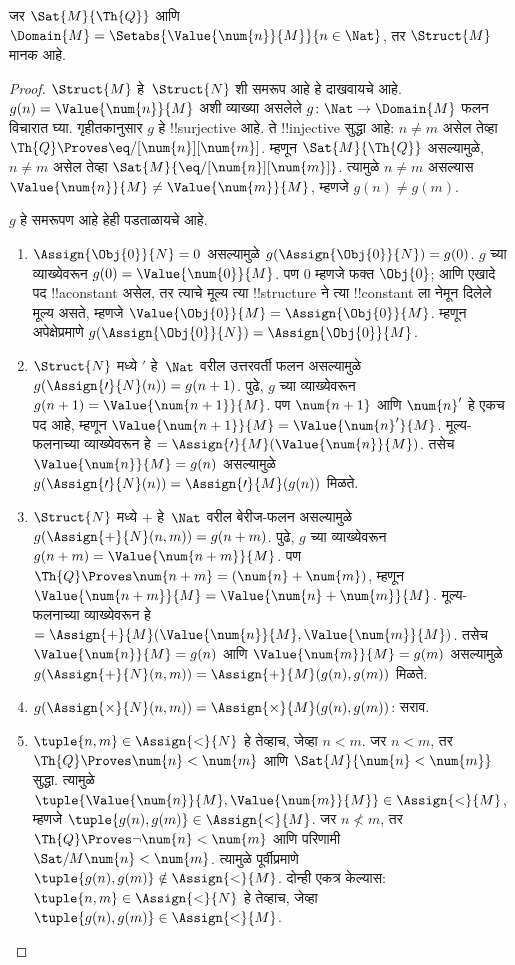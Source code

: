 \documentclass[../../../include/open-logic-section]{subfiles}
\begin{document}
\begin{prop}
जर $\Sat{M}{\Th{Q}}$ आणि $\Domain{M} =
\Setabs{\Value{\num{n}}{M}}{n \in \Nat}$, तर $\Struct{M}$ मानक आहे.
\end{prop}

\begin{proof}
$\Struct{M}$ हे~$\Struct{N}$ शी समरूप आहे हे दाखवायचे आहे.
$g(n) = \Value{\num{n}}{M}$ अशी व्याख्या असलेले
$g\colon \Nat \to \Domain{M}$ फलन विचारात घ्या. गृहीतकानुसार $g$ हे
!!{surjective} आहे. ते !!{injective} सुद्धा आहे: $n \neq m$ असेल तेव्हा
$\Th{Q} \Proves \eq/[\num{n}][\num{m}]$. म्हणून
$\Sat{M}{\Th{Q}}$ असल्यामुळे, $n \neq m$ असेल तेव्हा
$\Sat{M}{\eq/[\num{n}][\num{m}]}$. त्यामुळे $n \neq m$ असल्यास
$\Value{\num{n}}{M} \neq \Value{\num{m}}{M}$, म्हणजे $g(n) \neq g(m)$.

$g$ हे समरूपण आहे हेही पडताळायचे आहे.
\begin{enumerate}
\item $\Assign{\Obj{0}}{N} = 0$ असल्यामुळे
  $g(\Assign{\Obj{0}}{N}) = g(0)$. $g$ च्या व्याख्येवरून
  $g(0) = \Value{\num{0}}{M}$. पण $\num{0}$ म्हणजे फक्त $\Obj{0}$;
  आणि एखादे पद !!a{constant} असेल, तर त्याचे मूल्य त्या !!{structure} ने
  त्या !!{constant} ला नेमून दिलेले मूल्य असते, म्हणजे
  $\Value{\Obj{0}}{M} = \Assign{\Obj{0}}{M}$. म्हणून अपेक्षेप्रमाणे
  $g(\Assign{\Obj{0}}{N}) = \Assign{\Obj{0}}{M}$.
\item $\Struct{N}$ मध्ये $\prime$ हे~$\Nat$ वरील उत्तरवर्ती फलन असल्यामुळे
  $g(\Assign{\prime}{N}(n)) = g(n+1)$. पुढे, $g$ च्या व्याख्येवरून
  $g(n+1) = \Value{\num{n+1}}{M}$. पण $\num{n+1}$ आणि $\num{n}'$ हे
  एकच पद आहे, म्हणून $\Value{\num{n+1}}{M} = \Value{\num{n}'}{M}$.
  मूल्य-फलनाच्या व्याख्येवरून हे
  $= \Assign{\prime}{M}(\Value{\num{n}}{M})$. तसेच
  $\Value{\num{n}}{M} = g(n)$ असल्यामुळे
  $g(\Assign{\prime}{N}(n)) = \Assign{\prime}{M}(g(n))$ मिळते.
\item $\Struct{N}$ मध्ये $+$ हे~$\Nat$ वरील बेरीज-फलन असल्यामुळे
  $g(\Assign{+}{N}(n,m)) = g(n+m)$. पुढे, $g$ च्या व्याख्येवरून
  $g(n+m) = \Value{\num{n+m}}{M}$. पण $\Th{Q} \Proves
  \num{n+m} = (\num{n} + \num{m})$, म्हणून $\Value{\num{n+m}}{M} =
  \Value{\num{n}+\num{m}}{M}$. मूल्य-फलनाच्या व्याख्येवरून हे $=
  \Assign{+}{M}(\Value{\num{n}}{M},\Value{\num{m}}{M})$. तसेच
  $\Value{\num{n}}{M} = g(n)$ आणि $\Value{\num{m}}{M} = g(m)$ असल्यामुळे
  $g(\Assign{+}{N}(n, m)) = \Assign{+}{M}(g(n), g(m))$ मिळते.
\item $g(\Assign{\times}{N}(n, m)) = \Assign{\times}{M}(g(n), g(m))$:
  सराव.
\item $\tuple{n,m} \in \Assign{<}{N}$ हे तेव्हाच, जेव्हा $n < m$. जर
  $n < m$, तर $\Th{Q} \Proves \num{n} < \num{m}$ आणि
  $\Sat{M}{\num{n} < \num{m}}$ सुद्धा. त्यामुळे
  $\tuple{\Value{\num{n}}{M}, \Value{\num{m}}{M}} \in \Assign{<}{M}$,
  म्हणजे $\tuple{g(n), g(m)} \in \Assign{<}{M}$. जर $n \not< m$, तर
  $\Th{Q} \Proves \lnot \num{n} < \num{m}$ आणि परिणामी
  $\Sat/{M}{\num{n} < \num{m}}$. त्यामुळे पूर्वीप्रमाणे
  $\tuple{g(n), g(m)} \notin \Assign{<}{M}$. दोन्ही एकत्र केल्यास:
  $\tuple{n,m} \in \Assign{<}{N}$ हे तेव्हाच, जेव्हा
  $\tuple{g(n), g(m)} \in \Assign{<}{M}$.
\end{enumerate}
\end{proof}
\end{document}
